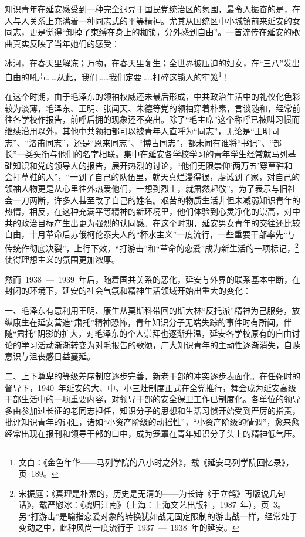 知识青年在延安感受到一种完全迥异于国民党统治区的氛围，最令人振奋的是，在人与人关系上充满着一种同志式的平等精神。尤其从国统区中小城镇前来延安的女同志，更是觉得“卸掉了束缚在身上的枷锁，分外感到自由”。一首流传在延安的歌曲真实反映了当年她们的感受：

\begin{quoting}
冰河，在春天里解冻；万物，在春天里复生；全世界被压迫的妇女，在“三八”发出自由的吼声……从此，我们……我们定要……打碎这锁人的牢笼\footnote{文白：《金色年华——马列学院的八小时之外》，载《延安马列学院回忆录》，页~189。}！
\end{quoting}在这个时期，由于毛泽东的领袖权威还未最后形成，中共政治生活中的礼仪化色彩较为淡薄，毛泽东、王明、张闻天、朱德等党的领袖穿着朴素，言谈随和，经常前往各学校作报告，前呼后拥的现象还不突出。除了“毛主席”这个称呼已被叫习惯而继续沿用以外，其他中共领袖都可以被青年人直呼为“同志”，无论是“王明同志”、“洛甫同志”，还是“恩来同志”、“博古同志”，都未闻有谁将“书记”、“部长”一类头衔与他们的名字相联。集中在延安各学校学习的青年学生经常就马列基础知识和党的领导人的报告，展开热烈的讨论，“他们无限崇仰‘两万五’穿草鞋和会打草鞋的人”，“一到了自己的队伍里，就天真烂漫得很，虔诚到了家，对自己的领袖人物更是从心里往外热爱他们，一想到烈士，就肃然起敬”。为了表示与旧社会一刀两断，许多人甚至改了自己的姓名。艰苦的物质生活非但未减弱知识青年的热情，相反，在这种充满平等精神的新环境里，他们体验到心灵净化的崇高，对中共的政治目标产生出更为强烈的认同感。在这个时期，延安男女青年的交往还比较自由，十月革命后苏俄柯伦泰夫人的“杯水主义”一度流行，一些重要干部率先“与传统作彻底决裂”，上行下效，“打游击”和“革命的恋爱”成为新生活的一项标记，\footnote{宋振庭：《真理是朴素的，历史是无清的——为长诗《于立鹤》再版说几句话》，载严慰冰：《魂归江南》（上海：上海文艺出版社，1987~年），页~3。另“打游击”是喻指恋爱对象的转换犹如战无固定限制的游击战一样，经常处于变动之中，此种风尚一度流行于~1937~—~1938~年的延安。}使得理想主义的氛围更加浓厚。

然而~1938~—~1939~年后，随着国共关系的恶化，延安与外界的联系基本中断，在封闭的环境下，延安的社会气氛和精神生活领域开始出重大的变化：

一、毛泽东有意利用王明、康生从莫斯科带回的斯大林“反托派”精神为己服务，放纵康生在延安营造“肃托”精神恐怖，青年知识分子无端失踪的事件时有所闻。伴随“肃托”阴影的扩大，对毛泽东的个人崇拜也逐渐升温，延安各学校原有的自由讨论的学习活动渐渐转变为对毛报告的歌颂，广大知识青年的主动性逐渐消失，自赎意识与沮丧感日益蔓延。

二、上下尊卑的等级差序制度逐步完善，新老干部的冲突逐步表面化。在任弼时的督导下，1940~年延安的大、中、小三灶制度正式在全党推行，舞会成为延安高级干部生活中的一项重要内容，对领导干部的安全保卫工作已制度化。各单位的领导多由参加过长征的老同志担任，知识分子的思想和生活习惯开始受到严厉的指责，批评知识青年的词汇，诸如“小资产阶级的动摇性”，“小资产阶级的情调”，愈来愈经常出现在报刊和领导干部的口中，成为笼罩在青年知识分子头上的精神低气压。

